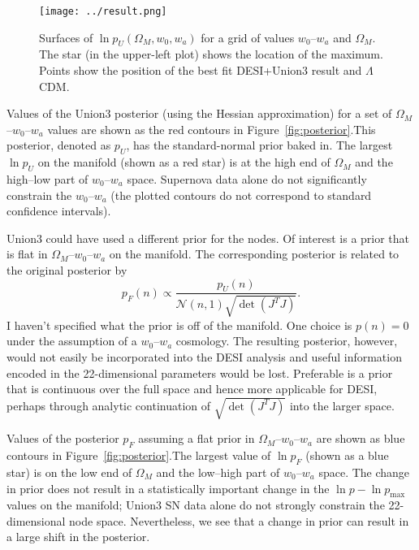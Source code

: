 \documentclass[11pt, oneside]{article}   	%
\begin{document}
\begin{figure}[htbp] %
   \centering
   \texttt{[image: ../result.png]} 
   \caption{Surfaces of $\ln{p_U}(\Omega_M, w_0,w_a)$  for a grid of values
 $w_0$--$w_a$ and $\Omega_M$.    The star (in the upper-left plot) shows the location of the maximum.
   Points show the position of the best fit  DESI+Union3
   result and  $\Lambda$CDM.}
   \label{fig:priors}
\end{figure}

Values of the Union3 posterior (using the Hessian approximation) for a
set of $\Omega_M$--$w_0$--$w_a$ values
are shown as the red contours in Figure~\ref{fig:posterior}.\footnotemark[2]
This posterior, denoted as $p_U$, has the standard-normal prior baked in. 
The largest $\ln{p_U}$ on the manifold (shown as a red star) is at the high end of $\Omega_M$ and the high--low
part of $w_0$--$w_a$ space.  
Supernova data alone do not significantly constrain the $w_0$--$w_a$ (the plotted contours do not correspond
to standard confidence intervals).



Union3 could have used a different prior for the nodes.  Of interest is a
prior that is flat in $\Omega_M$--$w_0$--$w_a$ on the manifold.
The corresponding posterior is related to the original posterior by
\begin{equation}
p_F(n) \propto \frac{p_U(n)}{\mathcal{N}(n,1)  \sqrt{\det{\left(J^T J\right)}}}.
\end{equation}
I haven't specified what the prior is off of the manifold.  One choice is $p(n)=0$ under the assumption
of a $w_0$--$w_a$ cosmology.  The resulting posterior, however, would not easily be incorporated into the DESI analysis
and useful information encoded in the 22-dimensional parameters would be lost.
Preferable is a prior that is continuous over the full space and hence more applicable for DESI,
perhaps through analytic continuation of $\sqrt{\det{\left(J^T J\right)}}$ into the larger space.


Values of the posterior $p_F$ assuming a flat
prior in $\Omega_M$--$w_0$--$w_a$  are shown as blue contours in Figure~\ref{fig:posterior}.\footnotemark[2]
The largest value of $\ln{p}_F$ (shown as a blue star) is on the low end of $\Omega_M$ and the  low--high
part of $w_0$--$w_a$ space.  
The
change in prior does not result in a statistically important change in the $\ln{p}-\ln{p}_\text{max}$ values on the manifold;
Union3 SN data alone do not strongly constrain the 22-dimensional node space.
Nevertheless, we see that a change in prior can result in a large shift in the posterior.
\end{document}
